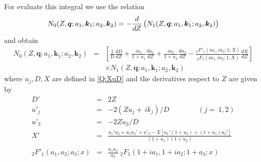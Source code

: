 For evaluate this integral we use the relation
%
\[
N_{0}(Z,\bm{q}; a_{1},\bm{k}_{1}; a_{2},\bm{k}_{2}) = - \frac{d
}{d Z}\left( N_{1}(Z,\bm{q}; a_{1},\bm{k}_{1}; a_{2},\bm{k}_{2})
\vstretch \right)
\]
%
and obtain
%
\begin{eqnarray*}
N_{0}(Z,\bm{q}; a_{1},\bm{k}_{1}; a_{2},\bm{k}_{2}) &=& \left[
\frac{1}{D} \frac{d D}{d Z} + \frac{i a_{1}}{1 + u_{1}}
\frac{d u_{1}}{d Z} + \frac{i a_{2}}{1 + u_{2}}\frac{d
u_{2}}{d Z} - \frac{{_{2}F'_{1}}(i a_{1}, i a_{2}; 1;
X)}{{_{2}F_{1}}(i a_{1}, i a_{2}; 1; X)} \frac{d X}{d Z}
\right]
\\
&&  {\times} N_{1}(Z,\bm{q};a_{1},\bm{k}_{1}; a_{2},\bm{k}_{2})
\end{eqnarray*}
%
where $u_{j},D,X$ are defined in \ref{Q:XuD} and the derivatives
respect to $Z$ are given by
\begin{eqnarray*}
D' &=& 2 Z \nonumber \\
u'_{j}&=& - 2 \left(Z u_{j} + \,i k_{j} \right)/D \qquad \qquad
(j=~1,2)
\nonumber \\
u'_{3} &=& -2 Z u_{3}/D
\nonumber \\
X' &=& \frac{ u_{1}' u_{2} + u_{1} u_{2}' + u'_{3} - X \left[ u_{1}'
(1+u_{2}) + (1+u_{1}) u_{2}' \right]}{(1 + u_{1})(1+u_{2})}
\nonumber \\
\\
{_{2}F'_{1}}(a_{1}, a_{2}; a_{3}; x) &=& \frac{a_{1} a_{2}}{a_{3}} \;
{_{2}F_{1}}(1 + i a_{1}, 1 + i a_{2};1+a_{3};x) \nonumber
\end{eqnarray*}


